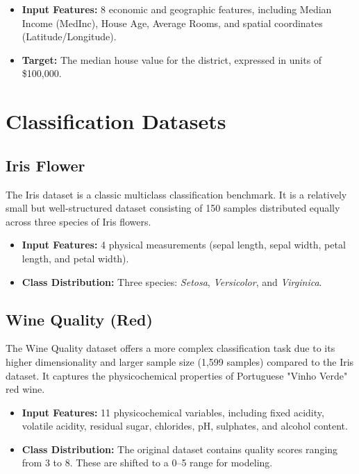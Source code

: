 \begin{itemize}
    \item \textbf{Input Features:} 8 economic and geographic features, including Median Income (MedInc), House Age, Average Rooms, and spatial coordinates (Latitude/Longitude).
    \item \textbf{Target:} The median house value for the district, expressed in units of \$100,000.
\end{itemize}

\section{Classification Datasets}

\subsection{Iris Flower}
\label{sec:ds_iris}
The Iris dataset is a classic multiclass classification benchmark. It is a relatively small but well-structured dataset consisting of 150 samples distributed equally across three species of Iris flowers.

\begin{itemize}
    \item \textbf{Input Features:} 4 physical measurements (sepal length, sepal width, petal length, and petal width).
    \item \textbf{Class Distribution:} Three species: \textit{Setosa}, \textit{Versicolor}, and \textit{Virginica}.
\end{itemize}



\subsection{Wine Quality (Red)}
\label{sec:ds_wine}
The Wine Quality dataset offers a more complex classification task due to its higher dimensionality and larger sample size (1,599 samples) compared to the Iris dataset. It captures the physicochemical properties of Portuguese "Vinho Verde" red wine.

\begin{itemize}
    \item \textbf{Input Features:} 11 physicochemical variables, including fixed acidity, volatile acidity, residual sugar, chlorides, pH, sulphates, and alcohol content.
    \item \textbf{Class Distribution:} The original dataset contains quality scores ranging from 3 to 8. These are shifted to a 0--5 range for modeling.
\end{itemize}


